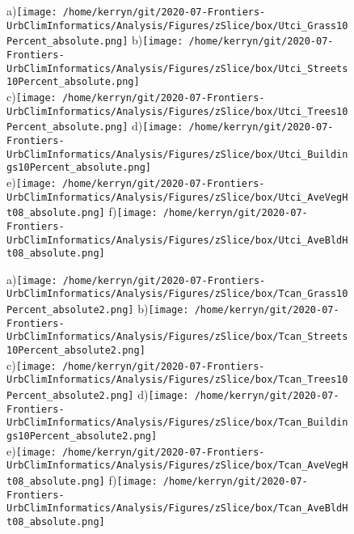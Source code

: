 \documentclass{article}
\begin{document}
\begin{figure}
\centering    
{\tiny a)}\texttt{[image: /home/kerryn/git/2020-07-Frontiers-UrbClimInformatics/Analysis/Figures/zSlice/box/Utci\_Grass10Percent\_absolute.png]}
{\tiny b)}\texttt{[image: /home/kerryn/git/2020-07-Frontiers-UrbClimInformatics/Analysis/Figures/zSlice/box/Utci\_Streets10Percent\_absolute.png]}\\
{\tiny c)}\texttt{[image: /home/kerryn/git/2020-07-Frontiers-UrbClimInformatics/Analysis/Figures/zSlice/box/Utci\_Trees10Percent\_absolute.png]}
{\tiny d)}\texttt{[image: /home/kerryn/git/2020-07-Frontiers-UrbClimInformatics/Analysis/Figures/zSlice/box/Utci\_Buildings10Percent\_absolute.png]}\\
{\tiny e)}\texttt{[image: /home/kerryn/git/2020-07-Frontiers-UrbClimInformatics/Analysis/Figures/zSlice/box/Utci\_AveVegHt08\_absolute.png]}
{\tiny f)}\texttt{[image: /home/kerryn/git/2020-07-Frontiers-UrbClimInformatics/Analysis/Figures/zSlice/box/Utci\_AveBldHt08\_absolute.png]}
\end{figure} 
\clearpage

















\begin{figure} %
\centering    
{\tiny a)}\texttt{[image: /home/kerryn/git/2020-07-Frontiers-UrbClimInformatics/Analysis/Figures/zSlice/box/Tcan\_Grass10Percent\_absolute2.png]}
{\tiny b)}\texttt{[image: /home/kerryn/git/2020-07-Frontiers-UrbClimInformatics/Analysis/Figures/zSlice/box/Tcan\_Streets10Percent\_absolute2.png]}\\
{\tiny c)}\texttt{[image: /home/kerryn/git/2020-07-Frontiers-UrbClimInformatics/Analysis/Figures/zSlice/box/Tcan\_Trees10Percent\_absolute2.png]}
{\tiny d)}\texttt{[image: /home/kerryn/git/2020-07-Frontiers-UrbClimInformatics/Analysis/Figures/zSlice/box/Tcan\_Buildings10Percent\_absolute2.png]}\\
{\tiny e)}\texttt{[image: /home/kerryn/git/2020-07-Frontiers-UrbClimInformatics/Analysis/Figures/zSlice/box/Tcan\_AveVegHt08\_absolute.png]}
{\tiny f)}\texttt{[image: /home/kerryn/git/2020-07-Frontiers-UrbClimInformatics/Analysis/Figures/zSlice/box/Tcan\_AveBldHt08\_absolute.png]}
\end{figure} 
\clearpage
\end{document}
